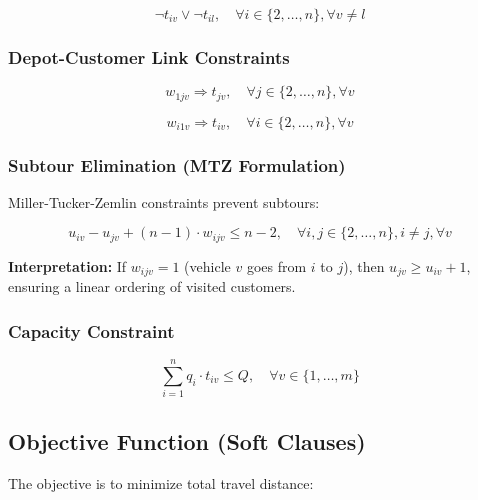 \documentclass[12pt,a4paper]{article}
\theoremstyle{definition}
\begin{document}
\begin{equation}
\neg t_{iv} \vee \neg t_{il}, \quad \forall i \in \{2, \ldots, n\}, \forall v \neq l \tag{C8}
\end{equation}

\subsubsection{Depot-Customer Link Constraints}

\begin{equation}
w_{1jv} \Rightarrow t_{jv}, \quad \forall j \in \{2, \ldots, n\}, \forall v \tag{C9: After leaving depot}
\end{equation}

\begin{equation}
w_{i1v} \Rightarrow t_{iv}, \quad \forall i \in \{2, \ldots, n\}, \forall v \tag{C10: Before returning}
\end{equation}

\subsubsection{Subtour Elimination (MTZ Formulation)}

Miller-Tucker-Zemlin constraints prevent subtours:

\begin{equation}
u_{iv} - u_{jv} + (n-1) \cdot w_{ijv} \leq n-2, \quad \forall i, j \in \{2, \ldots, n\}, i \neq j, \forall v \tag{C11}
\end{equation}

\textbf{Interpretation:} If $w_{ijv} = 1$ (vehicle $v$ goes from $i$ to $j$), then $u_{jv} \geq u_{iv} + 1$, ensuring a linear ordering of visited customers.

\subsubsection{Capacity Constraint}

\begin{equation}
\sum_{i=1}^{n} q_i \cdot t_{iv} \leq Q, \quad \forall v \in \{1, \ldots, m\} \tag{C12}
\end{equation}

\subsection{Objective Function (Soft Clauses)}

The objective is to minimize total travel distance:
\end{document}
